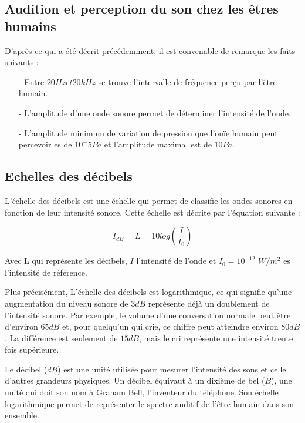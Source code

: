 \documentclass[conference,onecolumn]{IEEEtran}
\begin{document}
\subsection{Audition et perception du son chez les êtres humains}

D’après ce qui a été décrit précédemment, il est convenable de remarque les faits suivants :

\begin{itemize} %

    \item[-] Entre $20 Hz et 20 kHz$ se trouve l’intervalle de fréquence perçu par l’être humain.  

    \item[-] L’amplitude d’une onde sonore permet de déterminer l’intensité de l’onde. 

    \item[-] L’amplitude minimum de variation de pression que l’ouïe humain peut percevoir es de $10^-5 Pa$ et l’amplitude maximal est de $10 Pa$.

\end{itemize}

\subsection{Echelles des décibels}

L’échelle des décibels est une échelle qui permet de classifie les ondes sonores en fonction de leur intensité sonore. Cette échelle est décrite par l’équation suivante : 

\[I_{dB} = L = 10log(\dfrac{I}{I_0})\]

Avec L qui représente les décibels, $I$ l’intensité de l’onde et $I_0=10^{-12}$ $W/m^2$ es l’intensité de référence. 

Plus précisément, L’échelle des décibels est logarithmique, ce qui signifie qu’une augmentation du niveau sonore de $3 dB$ représente déjà un doublement de l’intensité sonore. Par exemple, le volume d’une conversation normale peut être d’environ $65 dB$ et, pour quelqu’un qui crie, ce chiffre peut atteindre environ $80 dB$. La différence est seulement de $15 dB$, mais le cri représente une intensité trente fois supérieure. 

Le décibel ($dB$) est une unité utilisée pour mesurer l'intensité des sons et celle d'autres grandeurs physiques. Un décibel équivaut à un dixième de bel ($B$), une unité qui doit son nom à Graham Bell, l'inventeur du téléphone. Son échelle logarithmique permet de représenter le spectre auditif de l’être humain dans son ensemble.
\end{document}
